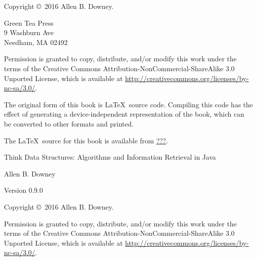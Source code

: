 \documentclass[12pt]{book}
\newcommand{\thetitle}{Think Data Structures}
\newcommand{\thesubtitle}{Algorithms and Information Retrieval in Java}
\newcommand{\theauthors}{Allen B. Downey}
\newcommand{\theversion}{0.9.0}
\theoremstyle{exercise}
\begin{document}
\begin{latexonly}
\newpage
\thispagestyle{empty}

Copyright \copyright ~2016 \theauthors.

\vspace{0.2in}

\begin{flushleft}
Green Tea Press \\
9 Washburn Ave \\
Needham, MA 02492
\end{flushleft}

Permission is granted to copy, distribute, and/or modify this work under the terms of the Creative Commons Attribution-NonCommercial-ShareAlike 3.0 Unported License, which is available at \url{http://creativecommons.org/licenses/by-nc-sa/3.0/}.

The original form of this book is \LaTeX\ source code.
Compiling this code has the effect of generating a device-independent representation of the book, which can be converted to other formats and printed.

The \LaTeX\ source for this book is available from
\url{???}.


\cleardoublepage
\setcounter{tocdepth}{1}
\tableofcontents

\end{latexonly}


\begin{htmlonly}

\vspace{1em}

{\Large \thetitle: \thesubtitle}

{\large \theauthors}

Version \theversion

\vspace{1em}

Copyright \copyright ~2016 \theauthors.

Permission is granted to copy, distribute, and/or modify this work under the terms of the Creative Commons Attribution-NonCommercial-ShareAlike 3.0 Unported License, which is available at \url{http://creativecommons.org/licenses/by-nc-sa/3.0/}.

\vspace{1em}

\end{htmlonly}
\end{document}
